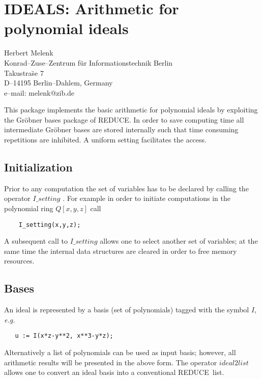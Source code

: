 \documentclass[11pt,letterpaper]{book}
\makeatletter
\newcommand{\REDUCE}{REDUCE}
\newcommand{\underscore}{\_}
\newcommand{\ttindex}[1]{{\renewcommand{\_}{\protect\underscore}%
                          \index{#1@{\tt #1}}}}
\makeatother
\begin{document}
\chapter{IDEALS: Arithmetic for polynomial ideals}
\label{IDEALS}

{\footnotesize
\begin{center}
Herbert Melenk \\
Konrad--Zuse--Zentrum f\"ur Informationstechnik Berlin \\
Takustra\"se 7 \\
D--14195 Berlin--Dahlem, Germany \\[0.05in]
e--mail: melenk@zib.de
\end{center}
}

\ttindex{IDEALS}

This package implements the basic arithmetic for polynomial ideals
by exploiting the Gr\"obner bases package of \REDUCE.
In order to save computing time all intermediate Gr\"obner bases
are stored internally such that time consuming repetitions
are inhibited. A uniform setting facilitates the access.

\section{Initialization}

Prior to any computation the set of variables has to be declared
by calling the operator $I\_setting$ .  For example in order to initiate
computations in the polynomial ring $Q[x,y,z]$ call
{\small\begin{verbatim}
    I_setting(x,y,z);
\end{verbatim}}
A subsequent call to $I\_setting$ allows one to select another set
of variables; at the same time the internal data structures
are cleared in order to free memory resources.

\section{Bases}

An ideal is represented by a basis (set of polynomials) tagged
with the symbol $I$, {\em e.g.\ }
{\small\begin{verbatim}
   u := I(x*z-y**2, x**3-y*z);
\end{verbatim}}
Alternatively a list of polynomials can be used as input basis; however,
all arithmetic results will be presented in the above form. The
operator $ideal2list$ allows one to convert an ideal basis into a
conventional \REDUCE\ list.
\end{document}
